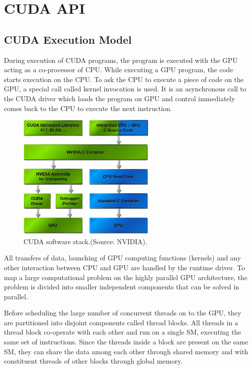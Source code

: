 \section{CUDA API}
\subsection{CUDA Execution Model}
During execution of CUDA programs, the program is executed with the GPU acting as a co-processor of CPU. While executing a GPU program, the code starts execution on the CPU. To ask the CPU to execute a piece of code on the GPU, a special call called kernel invocation is used. It is an asynchronous call to the CUDA driver which loads the program on GPU and control immediately comes back to the CPU to execute the next instruction. 
\begin{figure}[h]
	\centerline{
   \includegraphics[width=0.6\textwidth]{./Data/nvidia/cuda_fermi}  	
	}
	\caption{ CUDA software stack.(Source: NVIDIA).}
\label{fig:fermi:cuda}
\end{figure}

All transfers of data, launching of GPU computing functions (kernels) and any other interaction between CPU and GPU are handled by the runtime driver. To map a large computational problem on the highly parallel GPU architecture, the problem is divided into smaller independent components that can be solved in parallel.

Before scheduling the large number of concurrent threads on to the GPU, they are partitioned into disjoint components called thread blocks. All threads in a thread block co-operate with each other and run on a single SM, executing the same set of instructions. Since the threads inside a block are present on the same SM, they can share the data among each other through shared memory and with constituent threads of other blocks through global memory.

